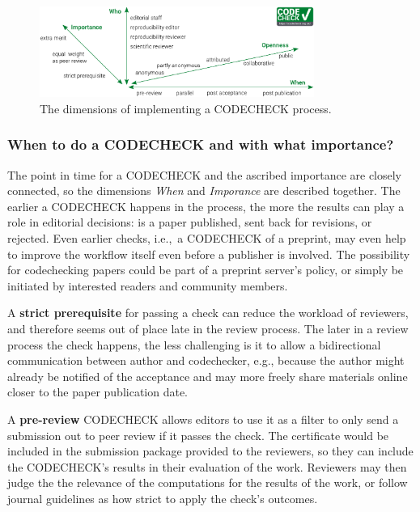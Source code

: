\documentclass[12pt]{article}
\begin{document}
\begin{figure}
  \centering
      \includegraphics[width=0.8\textwidth]{figs/codecheck_dimensions.pdf}
  \caption{The dimensions of implementing a CODECHECK process.}
  \label{fig:dimensions}
\end{figure}

\subsubsection*{When to do a CODECHECK and with what importance?}
\label{when-to-do-a-codecheck}

The point in time for a CODECHECK and the ascribed importance are closely
connected, so the dimensions \emph{When} and \emph{Imporance} are described
together.
The earlier a CODECHECK happens in the process, the more the
results can play a role in editorial decisions:
is a paper published, sent back for revisions, or rejected.
Even earlier checks, i.e.,~a CODECHECK of a preprint, may even help to 
improve the workflow itself even before a publisher is involved. The 
possibility for codechecking papers could be part of a preprint server's
policy, or simply be initiated by interested readers and community members.

A \textbf{strict prerequisite} for passing a check can reduce the workload
of reviewers, and therefore seems out of place late in the review process.
The later in a review process the check happens, the less challenging is it
to allow a bidirectional communication between author and codechecker, e.g.,
because the author might already be notified of the acceptance and may more
freely share materials online closer to the paper publication date.

A \textbf{pre-review} CODECHECK allows editors to use it as a filter to only
send  a submission out to peer review if it passes the check.
The certificate would  be included in the submission package provided
to the reviewers, so they can include the CODECHECK's results in their 
evaluation of the work.
Reviewers may then judge the the relevance of the computations for the results
of the work, or follow journal guidelines as how strict to apply the check's
outcomes.
\end{document}
